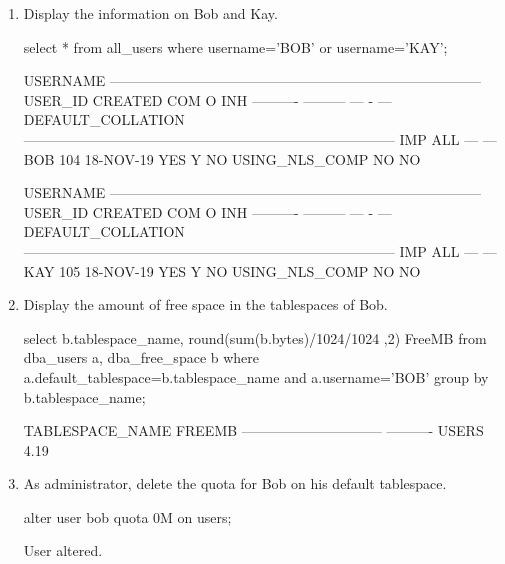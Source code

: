 \documentclass{article}
\begin{document}
\begin{enumerate}
\item{Display the information on Bob and Kay.}
\begin{sqlshell}
select * from all_users where username='BOB' or username='KAY';
\end{sqlshell}
\begin{messageshell}
USERNAME
--------------------------------------------------------------------------------
   USER_ID CREATED   COM O INH
---------- --------- --- - ---
DEFAULT_COLLATION
--------------------------------------------------------------------------------
IMP ALL
--- ---
BOB
       104 18-NOV-19 YES Y NO
USING_NLS_COMP
NO  NO


USERNAME
--------------------------------------------------------------------------------
   USER_ID CREATED   COM O INH
---------- --------- --- - ---
DEFAULT_COLLATION
--------------------------------------------------------------------------------
IMP ALL
--- ---
KAY
       105 18-NOV-19 YES Y NO
USING_NLS_COMP
NO  NO
\end{messageshell}
\item{Display the amount of free space in the tablespaces of Bob.}
\begin{sqlshell}
select b.tablespace_name, round(sum(b.bytes)/1024/1024 ,2) FreeMB from dba_users a, dba_free_space b where a.default_tablespace=b.tablespace_name and a.username='BOB' group by b.tablespace_name;
\end{sqlshell}
\begin{messageshell}
TABLESPACE_NAME                    FREEMB
------------------------------ ----------
USERS                                4.19
\end{messageshell}

\item{As administrator, delete the quota for Bob on his default tablespace.}
\begin{sqlshell}
alter user bob quota 0M on users;
\end{sqlshell}
\begin{messageshell}
User altered.
\end{messageshell}


\end{enumerate}
\end{document}
